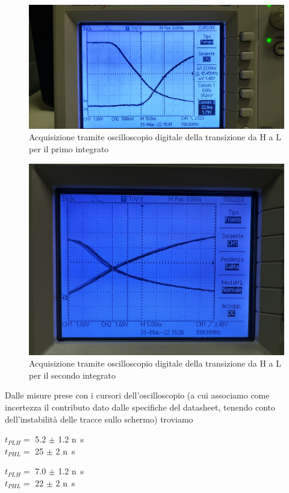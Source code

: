 \documentclass[10pt, a4paper, italian]{article}
\begin{document}
\begin{figure}[htbp]
\centering
	\includegraphics[width=\textwidth]{HL1}
	\caption{Acquisizione tramite oscilloscopio digitale della transizione da
	H a L per il primo integrato}
\end{figure}
\begin{figure}[htbp]
\centering
	\includegraphics[width=\textwidth]{HL2}
	\caption{Acquisizione tramite oscilloscopio digitale della transizione da
	H a L per il secondo integrato}
\end{figure}

Dalle misure prese con i cursori dell'oscilloscopio (a cui associamo come
incertezza il contributo dato dalle specifiche del datasheet, tenendo conto
dell'instabilità delle tracce sullo schermo) troviamo
\begin{multicols}{2}
    \centering
    $t_{PLH}=$ 5.2 $\pm$ 1.2 \si{n\s} \\
    $t_{PHL}=$ 25 $\pm$ 2 \si{n\s}
    
    $t_{PLH}=$ 7.0 $\pm$ 1.2 \si{n\s} \\
    $t_{PHL}=$ 22 $\pm$ 2 \si{n\s}
\end{multicols}
\end{document}
